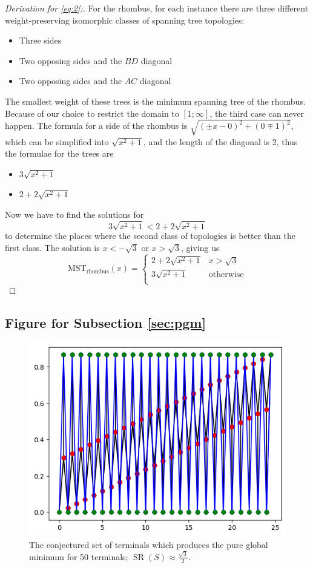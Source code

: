 \documentclass{mpaper}
\begin{document}
\begin{proof} [Derivation for \eqref{eq:2}:]
  For the rhombus, for each instance there are three different weight-preserving isomorphic classes of spanning tree topologies:
  \begin{itemize}
    \item Three sides
    \item Two opposing sides and the $BD$ diagonal
    \item Two opposing sides and the $AC$ diagonal
  \end{itemize}
  The smallest weight of these trees is the minimum spanning tree of the rhombus. Because of our choice to restrict the domain to $[1;\infty]$, the third case can never happen. The formula for a side of the rhombus is $\sqrt{(\pm x-0)^2+(0\mp 1)^2}$, which can be simplified into $\sqrt{x^2+1}$, and the length of the diagonal is 2, thus the formulae for the trees are
  \begin{itemize}
    \item $3\sqrt{x^2+1}$
    \item $2+2\sqrt{x^2+1}$
  \end{itemize}
  Now we have to find the solutions for $$3\sqrt{x^2+1} < 2+2\sqrt{x^2+1}$$  to determine the places where the second class of topologies is better than the first class. The solution is $x<-\sqrt{3}$ or $x>\sqrt{3}$, giving us
\[
  \operatorname{MST_{rhombus}}(x)=  
\begin{cases} 
  2+2\sqrt{x^2+1} & x >\sqrt{3} \\
  3\sqrt{x^2+1} & \text{otherwise} \\
\end{cases}
\]
\end{proof}
\subsection{Figure for Subsection \ref{sec:pgm}}
\begin{figure}[h!]
  \begin{center}
  \includegraphics[scale=0.5]{plot14.png}
  \end{center}
  \caption{\label{fig:15} The conjectured set of terminals which produces the pure global minimum for 50 terminals; $\operatorname{SR}(S) \approx \frac{\sqrt{3}}{2}$.}
\end{figure}
\end{document}
